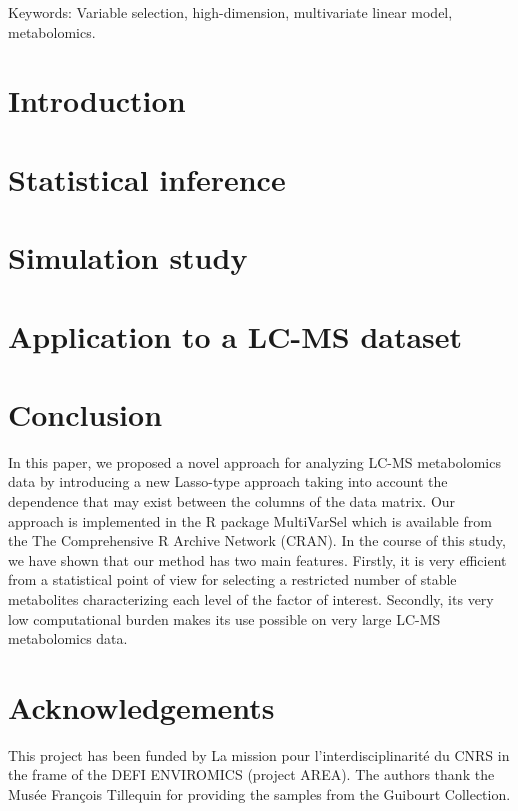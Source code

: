 \documentclass[11pt,a4paper,reqno]{amsart}
\begin{document}
\maketitle

Keywords: Variable selection, high-dimension, multivariate linear model, metabolomics.

 \section{Introduction}



\section{Statistical inference}\label{sec:stat_inf}

 

 \section{Simulation study}\label{sec:num_exp}



\section{Application to a LC-MS dataset}\label{sec:real}





\section{Conclusion}

In  this paper,  we  proposed  a novel  approach  for analyzing  LC-MS
metabolomics data by introducing a new Lasso-type approach taking into
account the dependence that may exist  between the columns of the data
matrix.   Our approach  is  implemented in  the R  package \textsf{MultiVarSel}
which is available from the The Comprehensive R Archive Network (CRAN).   
In the course  of this study, we  have shown
that our method  has two main features. Firstly, it  is very efficient
from a statistical point of view  for selecting a restricted number of
stable metabolites   characterizing each level   of   the    factor   of
interest. Secondly,  its very low  computational burden makes  its use
possible on very large LC-MS metabolomics data.

\section*{Acknowledgements}

This    project    has    been    funded   by    La    mission    pour
l'interdisciplinarit\'e du  CNRS in the  frame of the  DEFI ENVIROMICS
(project AREA).  The  authors thank the Mus\'ee  Fran\c cois Tillequin
for providing the samples from the Guibourt Collection.

% 
%  




\end{document}
